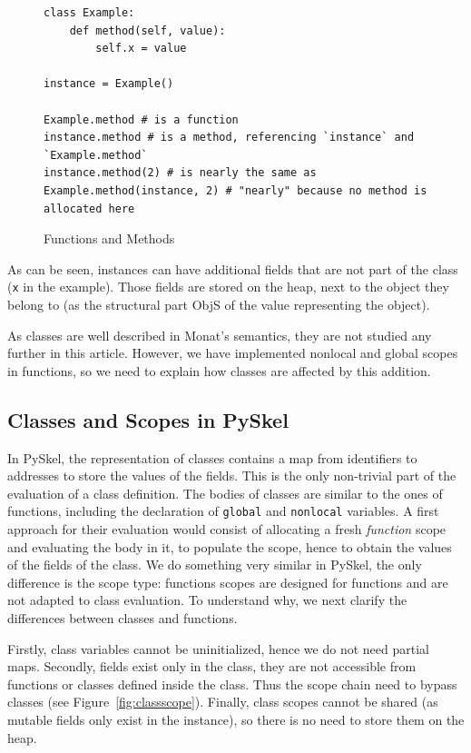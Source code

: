 \documentclass[submission,copyright,creativecommons]{eptcs}
\begin{document}
\begin{figure}[ht!]
  \centering
  \begin{minipage}{0.8\textwidth}
    \begin{verbatim}
class Example:
    def method(self, value):
        self.x = value

instance = Example()

Example.method # is a function
instance.method # is a method, referencing `instance` and `Example.method`
instance.method(2) # is nearly the same as
Example.method(instance, 2) # "nearly" because no method is allocated here
    \end{verbatim}
  \end{minipage}
  \caption{\label{fig:method}Functions and Methods}
\end{figure}

As can be seen, instances can have additional fields that are not part of the class (\texttt{x} in the example).
Those fields are stored on the heap, next to the object they belong to (as the
structural part \textsf{ObjS} of the value representing the object).



As classes are well described in Monat's semantics, they are not studied any further in this article.
However, we have implemented nonlocal and global scopes in functions, so we need to explain how classes are affected by this addition.

\subsection{Classes and Scopes in PySkel}
In PySkel, the representation of classes contains a map from identifiers to
addresses to store the values of the fields.
This is the only non-trivial part of the evaluation of a class definition.
The bodies of classes are similar to the ones of functions, including the
declaration of \texttt{global} and \texttt{nonlocal}
variables. A first approach for their evaluation would consist of allocating a
fresh \emph{function} scope and evaluating the body in it, to populate the scope,
hence to obtain the values of the fields of the class.
We do something very similar in PySkel, the only difference is the scope type: functions scopes are designed for functions and are not adapted to class evaluation.
To understand why, we next clarify the differences between classes and functions.

Firstly, class variables cannot be uninitialized, hence we do not need partial maps.
Secondly, fields exist only in the class, they are not accessible from functions
or classes defined inside the class. Thus the scope chain need to bypass classes (see Figure~\ref{fig:classscope}).
Finally, class scopes cannot be shared (as mutable fields only exist in the instance), so
there is no need to store them on the heap.
\end{document}
